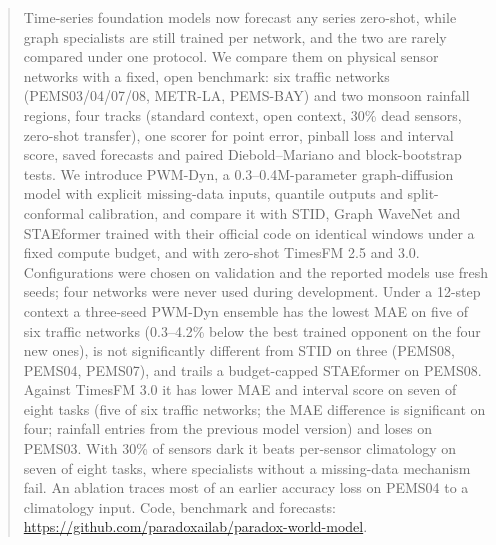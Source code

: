 \begin{abstract}
Time-series foundation models now forecast any series zero-shot, while graph specialists are still trained per
network, and the two are rarely compared under one protocol. We compare them on physical sensor networks with a fixed,
open benchmark: six traffic networks (PEMS03/04/07/08, METR-LA, PEMS-BAY) and two monsoon rainfall regions, four
tracks (standard context, open context, 30\% dead sensors, zero-shot transfer), one scorer for point error, pinball
loss and interval score, saved forecasts and paired Diebold--Mariano and block-bootstrap tests. We introduce PWM-Dyn,
a 0.3--0.4M-parameter graph-diffusion model with explicit missing-data inputs, quantile outputs and split-conformal
calibration, and compare it with STID, Graph WaveNet and STAEformer trained with their official code on identical
windows under a fixed compute budget, and with zero-shot TimesFM 2.5 and 3.0. Configurations were chosen on
validation and the reported models use fresh seeds; four networks were never used during development. Under a
12-step context a three-seed PWM-Dyn ensemble has the lowest MAE on five of six traffic networks (0.3--4.2\% below the best trained opponent
on the four new ones), is not significantly different from STID on three (PEMS08, PEMS04, PEMS07), and trails a
budget-capped STAEformer on PEMS08. Against TimesFM 3.0 it has lower MAE and interval score on seven of eight tasks
(five of six traffic networks; the MAE difference is significant on four; rainfall entries from the previous model
version) and loses
on PEMS03. With 30\% of sensors dark it beats per-sensor
climatology on seven of eight tasks, where specialists without a missing-data mechanism fail. An ablation traces most of an
earlier accuracy loss on PEMS04 to a climatology input. Code, benchmark and forecasts: \url{https://github.com/paradoxailab/paradox-world-model}.
\end{abstract}
